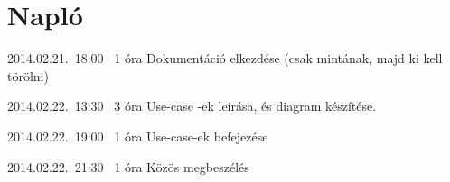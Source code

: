 %
\section{Napló}

\begin{naplo}

\bejegyzes
{2014.02.21.~18:00~} %
{1 óra} %
{\antal} %
{Dokumentáció elkezdése (csak mintának, majd ki kell törölni)} %

\bejegyzes
{2014.02.22.~13:30~}
{3 óra}
{\adam}
{Use-case -ek leírása, és diagram készítése.}

\bejegyzes
{2014.02.22.~19:00~}
{1 óra}
{\adam}
{Use-case-ek befejezése}

\bejegyzes
{2014.02.22.~21:30~}
{1 óra}
{\adam}
{Közös megbeszélés}

\end{naplo}

